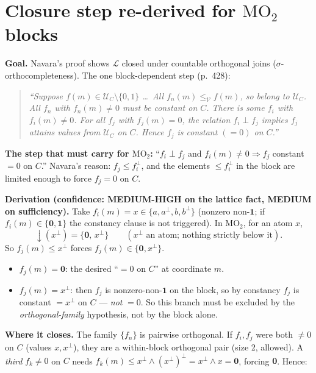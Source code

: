 \documentclass[11pt]{article}
\newcommand{\MOtwo}{\mathrm{MO}_2}
\newcommand{\Ucal}{\mathcal{U}}
\newcommand{\Vcal}{\mathcal{V}}
\newcommand{\Lcal}{\mathcal{L}}
\begin{document}
\section{Closure step re-derived for $\MOtwo$ blocks
  }

\noindent\textbf{Goal.} Navara's proof shows $\Lcal$ closed under countable
orthogonal joins ($\sigma$-orthocompleteness). The one block-dependent step
(p.~428):
\begin{quote}\itshape
``Suppose $f(m)\in\Ucal_C\setminus\{0,1\}$ \dots\ All $f_n(m)\le_\Vcal f(m)$,
so belong to $\Ucal_C$. All $f_n$ with $f_n(m)\neq0$ must be constant on $C$.
There is some $f_i$ with $f_i(m)\neq0$. For all $f_j$ with $f_j(m)=0$, the
relation $f_i\perp f_j$ implies $f_j$ attains values from $\Ucal_C$ on $C$.
Hence $f_j$ is constant $(=0)$ on $C$.''
\end{quote}

\noindent\textbf{The step that must carry for $\MOtwo$:}
``$f_i\perp f_j$ and $f_i(m)\neq0\Rightarrow f_j$ constant $=0$ on $C$.''
Navara's reason: $f_j\le f_i^\perp$, and the elements $\le f_i^\perp$ in the
block are limited enough to force $f_j=0$ on $C$.

\medskip
\noindent\textbf{Derivation \textnormal{(confidence: MEDIUM-HIGH on the lattice
fact, MEDIUM on sufficiency).}}
Take $f_i(m)=x\in\{a,a^\perp,b,b^\perp\}$ (nonzero non-$\mathbf 1$; if
$f_i(m)\in\{\mathbf 0,\mathbf 1\}$ the constancy clause is not triggered). In
$\MOtwo$, for an atom $x$,
\[
  {\downarrow}(x^\perp)=\{\mathbf 0,\,x^\perp\}
  \qquad(\text{$x^\perp$ an atom; nothing strictly below it}).
\]
So $f_j(m)\le x^\perp$ forces $f_j(m)\in\{\mathbf 0,x^\perp\}$.
\begin{itemize}[noitemsep]
  \item $f_j(m)=\mathbf 0$: the desired ``$=0$ on $C$'' at coordinate $m$. \checkmark
  \item $f_j(m)=x^\perp$: then $f_j$ is nonzero-non-$\mathbf 1$ on the block,
    so by constancy $f_j$ is constant $=x^\perp$ on $C$ --- \emph{not} $=0$. So
    this branch must be excluded by the \emph{orthogonal-family} hypothesis,
    not by the block alone.
\end{itemize}

\noindent\textbf{Where it closes.} The family $\{f_n\}$ is pairwise orthogonal.
If $f_i,f_j$ were both $\neq0$ on $C$ (values $x,x^\perp$), they are a
within-block orthogonal pair (size 2, allowed). A \emph{third} $f_k\neq0$ on
$C$ needs $f_k(m)\le x^\perp\wedge(x^\perp)^\perp=x^\perp\wedge x=\mathbf 0$,
forcing $\mathbf 0$. Hence:
\end{document}
